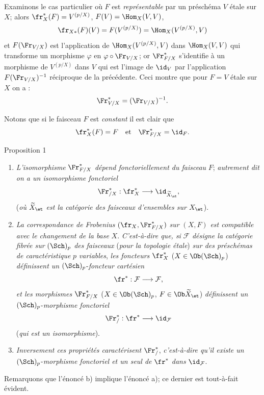 Examinons le cas particulier où $F$ est \emph{représentable} par un préschéma $V$ étale sur $X$; alors $\fr_X^*(F)=V^{(p/X)}$, $F(V)=\Hom_X(V,V)$,
\[
\fr_{X*}(F)(V)=F(V^{(p/X)})=\Hom_X(V^{(p/X)},V)
\]
et $F(\Fr_{V/X})$ est l'application de $\Hom_X(V^{(p/X)},V)$ dans $\Hom_X(V,V)$ qui transforme un morphisme $\varphi$ en $\varphi\circ\Fr_{V/X}$; or $\Fr^*_{F/X}$ s'identifie à un morphisme de $V^{(p/X)}$ dans $V$ qui est l'image de $\id_V$ par l'application $F(\Fr_{V/X})^{-1}$ réciproque de la précédente. Ceci montre que pour $F=V$ étale sur $X$ on a :
\[
\Fr^*_{V/X}=(\Fr_{V/X})^{-1}.
\]

Notons que si le faisceau $F$ est \emph{constant} il est clair que
\[
\fr_X^*(F)=F
\quad\text{et}\quad
\Fr^*_{F/X}=\id_F.
\]

\begin{statement}{Proposition 1}
\begin{enumerate}[label=\alph*)]
\item \emph{L'isomorphisme} $\Fr^*_{F/X}$ \emph{dépend fonctoriellement du faisceau} $F$; \emph{autrement dit on a un isomorphisme fonctoriel}
\[
\Fr^*_{/X}:\fr_X^*\longrightarrow \id_{\widetilde X_{\et}},
\]
(\emph{où} $\widetilde X_{\et}$ \emph{est la catégorie des faisceaux d'ensembles sur} $X_{\et}$).
\item \emph{La correspondance de Frobenius} $(\fr_X,\Fr^*_{F/X})$ \emph{sur} $(X,F)$ \emph{est compatible avec le changement de la base} $X$. \emph{C'est-à-dire que, si} $\mathcal{F}$ \emph{désigne la catégorie fibrée sur} $(\Sch)_p$ \emph{des faisceaux} (\emph{pour la topologie étale}) \emph{sur des préschémas de caractéristique} $p$ \emph{variables}, \emph{les foncteurs} $\fr_X^*$ ($X\in\Ob(\Sch)_p$) \emph{définissent un} $(\Sch)_p$-\emph{foncteur cartésien}
\[
\fr^*: \mathcal{F}\longrightarrow\mathcal{F},
\]
\emph{et les morphismes} $\Fr^*_{F/X}$ ($X\in\Ob(\Sch)_p$, $F\in\Ob\widetilde X_{\et}$) \emph{définissent un} $(\Sch)_p$-\emph{morphisme fonctoriel}
\[
\Fr^*_{/}:\fr^*\longrightarrow\id_{\mathcal{F}}
\]
(\emph{qui est un isomorphisme}).
\item \emph{Inversement ces propriétés caractérisent} $\Fr^*_{/}$, \emph{c'est-à-dire qu'il existe un} $(\Sch)_p$-\emph{morphisme fonctoriel et un seul de} $\fr^*$ \emph{dans} $\id_{\mathcal{F}}$.
\end{enumerate}
\end{statement}

Remarquons que l'énoncé b) implique l'énoncé a); ce dernier est tout-à-fait évident.


